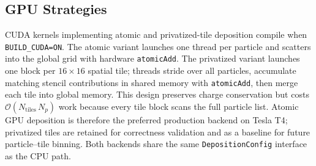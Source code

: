 \subsection{GPU Strategies}
CUDA kernels implementing atomic and privatized-tile deposition compile when \texttt{BUILD\_CUDA=ON}.
The atomic variant launches one thread per particle and scatters into the global grid with hardware \texttt{atomicAdd}.
The privatized variant launches one block per $16\times16$ spatial tile; threads stride over all particles, accumulate matching stencil contributions in shared memory with \texttt{atomicAdd}, then merge each tile into global memory.
This design preserves charge conservation but costs $\mathcal{O}(N_{\mathrm{tiles}}\,N_p)$ work because every tile block scans the full particle list.
Atomic GPU deposition is therefore the preferred production backend on Tesla T4; privatized tiles are retained for correctness validation and as a baseline for future particle--tile binning.
Both backends share the same \texttt{DepositionConfig} interface as the CPU path.
